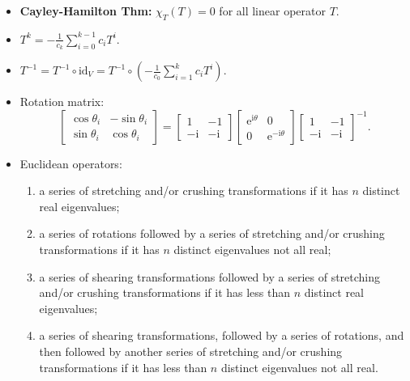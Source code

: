 \documentclass[10pt]{article}
\newcommand{\im}{\mathrm{i}}
\begin{document}
    \begin{multicols*}{3}
        \begin{itemize}
            \item \textbf{Cayley-Hamilton Thm:} $\chi_T(T) = 0$ for all linear operator $T$.
            \item $T^k = -\frac{1}{c_k}\sum_{i = 0}^{k - 1}c_iT^i$.
            \item $T^{-1} = T^{-1} \circ \mathrm{id}_V = T^{-1} \circ \left(-\frac{1}{c_0}\sum_{i = 1}^{k}c_iT^i\right)$.
            \item Rotation matrix: 
            \begin{equation*}
                \begin{bmatrix}
                    \cos\theta_i & -\sin\theta_i \\
                    \sin\theta_i & \cos\theta_i
                \end{bmatrix} = \begin{bmatrix}
                    1 & -1 \\
                    -\im & -\im
                \end{bmatrix}\begin{bmatrix}
                    \mathrm{e}^{\im\theta} & 0 \\
                    0 & \mathrm{e}^{-\im\theta}
                \end{bmatrix}\begin{bmatrix}
                    1 & -1 \\
                    -\im & -\im
                \end{bmatrix}^{-1}.
            \end{equation*}
            \item Euclidean operators:
            \begin{enumerate}
                \item a series of stretching and/or crushing transformations if it has $n$ distinct real eigenvalues;
                \item a series of rotations followed by a series of stretching and/or crushing transformations if it has $n$ distinct eigenvalues not all real;
                \item a series of shearing transformations followed by a series of stretching and/or crushing transformations if it has less than $n$ distinct real eigenvalues;
                \item a series of shearing transformations, followed by a series of rotations, and then followed by another series of stretching and/or crushing transformations if it has less than $n$ distinct eigenvalues not all real.

\end{enumerate}
\end{itemize}
\end{multicols*}
\end{document}
